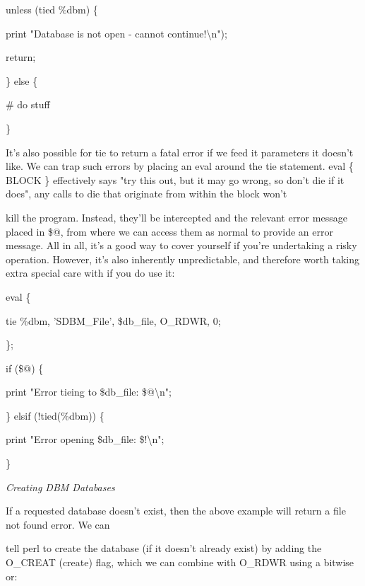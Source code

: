 \documentclass[a4paper,11pt]{book}
\begin{document}
\noindent 

\noindent 

\noindent unless (tied \%dbm) \{

\noindent print "Database is not open - cannot continue!\textbackslash n");

\noindent return;

\noindent \} else \{

\noindent \# do stuff

\noindent \}

\noindent 

\noindent It's also possible for tie to return a fatal error if we feed it parameters it doesn't like. We can trap such errors by placing an eval around the tie statement. eval \{ BLOCK \} effectively says "try this out, but it may go wrong, so don't die if it does", any calls to die that originate from within the block won't

\noindent kill the program. Instead, they'll be intercepted and the relevant error message placed in \$@, from where we can access them as normal to provide an error message. All in all, it's a good way to cover yourself if you're undertaking a risky operation. However, it's also inherently unpredictable, and therefore worth taking extra special care with if you do use it:

\noindent 

\noindent 

\noindent eval \{

\noindent tie \%dbm, 'SDBM\_File', \$db\_file, O\_RDWR, 0;

\noindent \};

\noindent 

\noindent if (\$@) \{

\noindent print "Error tieing to \$db\_file: \$@\textbackslash n";

\noindent \} elsif (!tied(\%dbm)) \{

\noindent print "Error opening \$db\_file: \$!\textbackslash n";

\noindent \}

\noindent 

\noindent 

\noindent \textit{Creating DBM Databases}

\noindent If a requested database doesn't exist, then the above example will return a file not found error. We can

\noindent tell perl to create the database (if it doesn't already exist) by adding the O\_CREAT (create) flag, which we can combine with O\_RDWR using a bitwise or:
\end{document}
